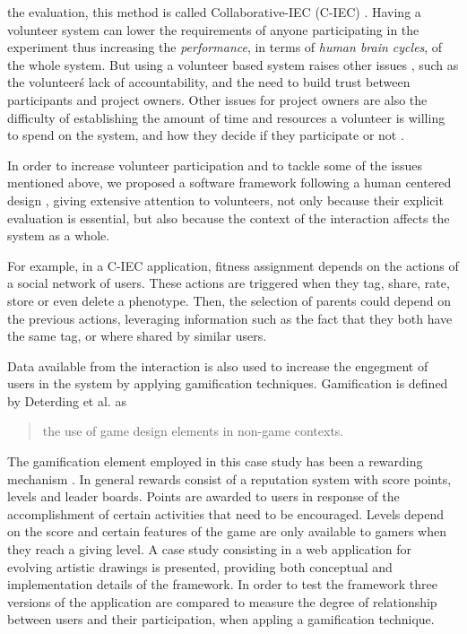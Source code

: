 the evaluation, this method is called Collaborative-IEC (C-IEC)
\cite{picbreeder,seyama2016development,wagy2014collective}.
Having a volunteer system can lower the requirements of anyone participating in
the experiment thus increasing the {\em performance}, in terms of 
{\em human brain cycles}, of the whole system. But using a volunteer based 
system raises other issues \cite{sarmenta2001volunteer,web:BOINC}, such as the 
volunteer\'s lack of accountability, and the need to build trust between participants and project
owners. Other issues for project owners are also the difficulty of establishing 
the amount of time and resources a volunteer is willing to spend on the system, 
and how they decide if they participate or not \cite{JJ:2016}. 

In order to increase volunteer participation and to tackle some of the issues mentioned above,  
we proposed a software framework following a human centered design \cite{greenhouse2012human},
giving extensive attention to volunteers, not only because their
explicit evaluation is essential, but also because the context of the 
interaction affects the system as a whole.

For example, in a C-IEC application, fitness assignment depends on the
actions of a social network of users.  These actions are triggered when 
they tag, share, rate, store or even delete a phenotype. 
Then, the selection of parents could depend on the previous actions, leveraging information 
such as the fact that they both have the same tag, or where shared by
similar users.

Data available from the interaction is also used to increase the engegment of 
users in the system by applying  gamification techniques. Gamification is defined by 
Deterding et al. \cite{deterding2011game} as
\begin{quote}
  the use of game design elements in non-game contexts.
\end{quote}  
The gamification element employed in this case study has been a rewarding mechanism  
\cite{dubois2013understanding}. In general rewards  consist of a reputation system 
with score points, levels and leader boards. Points are awarded to users in response of 
the accomplishment of certain activities that need to be encouraged. Levels depend
on the score and certain features of the game are only available to gamers when 
they reach a giving level. %
A case study consisting in a web application for evolving artistic drawings
is presented, providing both conceptual and implementation details of the framework. 
In order to test the framework three versions of the application are compared to
measure the degree of relationship between users and their participation,
when appling a gamification technique. 


